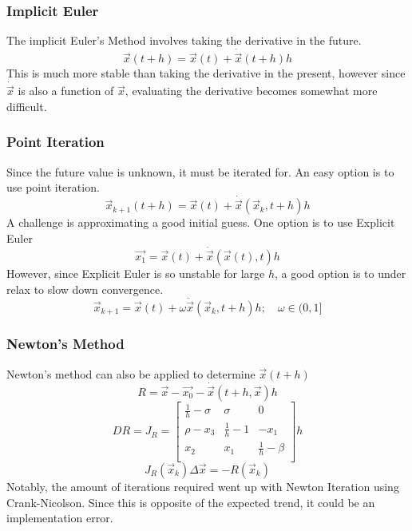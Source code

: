 \documentclass[12pt,twocolumn]{article}
\begin{document}
\subsubsection*{Implicit Euler}
The implicit Euler's Method involves taking the derivative in the future.
\begin{equation}
\vec x(t+h) = \vec x(t) + \dot{\vec{x}}(t+h)h
\end{equation}
This is much more stable than taking the derivative in the present, however
since $\dot{\vec{x}}$ is also a function of $\vec x$, evaluating the derivative
becomes somewhat more difficult.

\subsubsection*{Point Iteration}
Since the future value is unknown, it must be iterated for. An easy option is to use point iteration.
\begin{equation}
\vec{x}_{k+1}(t+h) = \vec x(t) + \dot{\vec{x}}(\vec{x}_k,t+h)h
\end{equation}
A challenge is approximating a good initial guess. One option is to use Explicit Euler
\begin{equation}
\vec{x_1} = \vec{x}(t) + \dot{\vec{x}}(\vec{x}(t),t)h
\end{equation}
However, since Explicit Euler is so unstable for large $h$, a good option is to under relax to slow down convergence.
\begin{equation}
\vec{x}_{k+1} = \vec{x}(t) + \omega\dot{\vec{x}}(\vec{x}_k,t+h)h;\hspace{1em}\omega \in (0,1]
\end{equation}
\subsubsection*{Newton's Method}
Newton's method can also be applied to determine $\vec{x}(t+h)$
\begin{equation}
R = \vec{x} - \vec{x_0} - \dot{\vec{x}}(t+h,\vec{x})h
\end{equation}
\begin{equation}
DR = J_R =
\begin{bmatrix}
\frac{1}{h}-\sigma & \sigma & 0 \\
\rho - x_3 & \frac{1}{h}-1 & -x_1 \\
x_2 & x_1 & \frac{1}{h}-\beta \\
\end{bmatrix}h
\end{equation}
\begin{equation}
J_R(\vec{x}_k)\Delta \vec{x} = -R(\vec{x}_k)
\end{equation}
Notably, the amount of iterations required went up with Newton Iteration using Crank-Nicolson.
Since this is opposite of the expected trend, it could be an implementation error.
\end{document}
